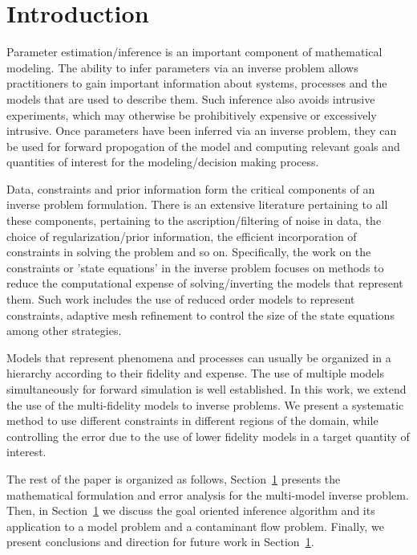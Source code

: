 \section{Introduction}

Parameter estimation/inference is an important component of mathematical modeling. The ability to infer parameters via an inverse problem allows practitioners to gain important information about systems, processes and the models that are used to describe them. Such inference also avoids intrusive experiments, which may otherwise be prohibitively expensive or excessively intrusive. Once parameters have been inferred via an inverse problem, they can be used for forward propogation of the model and computing relevant goals and quantities of interest for the modeling/decision making process.

Data, constraints and prior information form the critical components of an inverse problem formulation. There is an extensive literature pertaining to all these components, pertaining to the ascription/filtering of noise in data, the choice of regularization/prior information, the efficient incorporation of constraints in solving the problem and so on. Specifically, the work on the constraints or 'state equations' in the inverse problem focuses on methods to reduce the computational expense of solving/inverting the models that represent them. Such work includes the use of reduced order models to represent constraints, adaptive mesh refinement to control the size of the state equations among other strategies.

Models that represent phenomena and processes can usually be organized in a hierarchy according to their fidelity and expense. The use of multiple models simultaneously for forward simulation is well established. In this work, we extend the use of the multi-fidelity models to inverse problems. We present a systematic method to use different constraints in different regions of the domain, while controlling the error due to the use of lower fidelity models in a target quantity of interest.

The rest of the paper is organized as follows, Section~\ref{} presents the mathematical formulation and error analysis for the multi-model inverse problem. Then, in Section~\ref{} we discuss the goal oriented inference algorithm and its application to a model problem and a contaminant flow problem. Finally, we present conclusions and direction for future work in Section~\ref{}.
